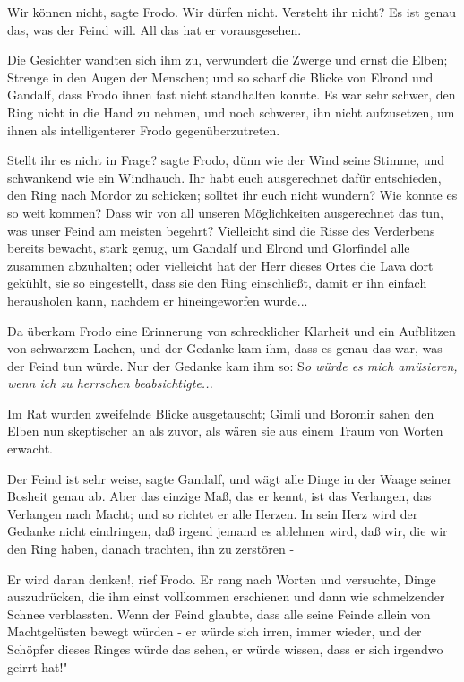 \glqq{}Wir können nicht\grqq{}, sagte Frodo. \glqq{}Wir dürfen nicht. Versteht ihr
nicht? Es ist genau das, was der Feind will. All das hat er
vorausgesehen.\grqq{}

Die Gesichter wandten sich ihm zu, verwundert die Zwerge und ernst die Elben;
Strenge in den Augen der Menschen; und so scharf die Blicke von Elrond und
Gandalf, dass Frodo ihnen fast nicht standhalten konnte. Es war sehr schwer, den
Ring nicht in die Hand zu nehmen, und noch schwerer, ihn nicht aufzusetzen, um
ihnen als intelligenterer Frodo gegenüberzutreten.

\glqq{}Stellt ihr es nicht in Frage?\grqq{} sagte Frodo, dünn wie der Wind seine
Stimme, und schwankend wie ein Windhauch. \glqq{}Ihr habt euch ausgerechnet dafür
entschieden, den Ring nach Mordor zu schicken; solltet ihr euch nicht wundern?
Wie konnte es so weit kommen? Dass wir von all unseren Möglichkeiten
ausgerechnet das tun, was unser Feind am meisten begehrt? Vielleicht sind die
Risse des Verderbens bereits bewacht, stark genug, um Gandalf und Elrond und
Glorfindel alle zusammen abzuhalten; oder vielleicht hat der Herr dieses Ortes
die Lava dort gekühlt, sie so eingestellt, dass sie den Ring einschließt, damit
er ihn einfach herausholen kann, nachdem er hineingeworfen wurde...\grqq{}

Da überkam Frodo eine Erinnerung von schrecklicher Klarheit und ein Aufblitzen
von schwarzem Lachen, und der Gedanke kam ihm, dass es genau das war, was der
Feind tun würde. Nur der Gedanke kam ihm so: S\emph{o würde es mich amüsieren,
wenn ich zu herrschen beabsichtigte...}

Im Rat wurden zweifelnde Blicke ausgetauscht; Gimli und Boromir sahen den Elben
nun skeptischer an als zuvor, als wären sie aus einem Traum von Worten erwacht.

\glqq{}Der Feind ist sehr weise\grqq{}, sagte Gandalf, \glqq{}und wägt alle Dinge
in der Waage seiner Bosheit genau ab. Aber das einzige Maß, das er kennt, ist
das Verlangen, das Verlangen nach Macht; und so richtet er alle Herzen. In sein
Herz wird der Gedanke nicht eindringen, daß irgend jemand es ablehnen wird, daß
wir, die wir den Ring haben, danach trachten, ihn zu zerstören -\grqq{}

\glqq{}Er wird daran denken!\grqq{}, rief Frodo. Er rang nach Worten und
versuchte, Dinge auszudrücken, die ihm einst vollkommen erschienen und dann wie
schmelzender Schnee verblassten. \glqq{}Wenn der Feind glaubte, dass alle seine
Feinde allein von Machtgelüsten bewegt würden - er würde sich irren, immer
wieder, und der Schöpfer dieses Ringes würde das sehen, er würde wissen, dass er
sich irgendwo geirrt hat!"

